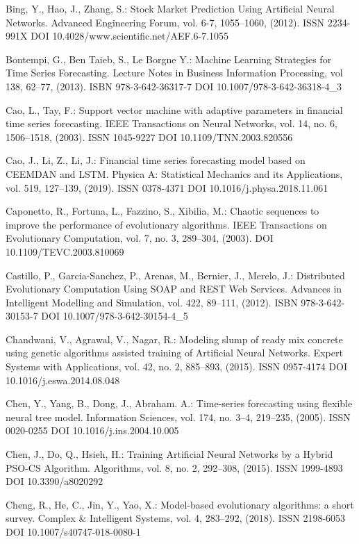 \begin{thebibliography}{99.}
 Bing, Y., Hao, J., Zhang, S.: Stock Market Prediction Using Artificial Neural Networks. Advanced Engineering Forum, vol. 6-7, 1055--1060, (2012). ISSN 2234-991X DOI 10.4028/www.scientific.net/AEF.6-7.1055

 Bontempi, G., Ben Taieb, S., Le Borgne Y.: Machine Learning Strategies for Time Series Forecasting. Lecture Notes in Business Information Processing, vol 138, 62--77, (2013). ISBN 978-3-642-36317-7 DOI 10.1007/978-3-642-36318-4\_3

 Cao, L., Tay, F.: Support vector machine with adaptive parameters in financial time series forecasting. IEEE Transactions on Neural Networks, vol. 14, no. 6, 1506--1518, (2003). ISSN 1045-9227 DOI 10.1109/TNN.2003.820556

 Cao, J., Li, Z., Li, J.: Financial time series forecasting model based on CEEMDAN and LSTM. Physica A: Statistical Mechanics and its Applications, vol. 519, 127--139, (2019). ISSN 0378-4371 DOI 10.1016/j.physa.2018.11.061

 Caponetto, R., Fortuna, L., Fazzino, S., Xibilia, M.: Chaotic sequences to improve the performance of evolutionary algorithms. IEEE Transactions on Evolutionary Computation, vol. 7, no. 3, 289--304, (2003). DOI 10.1109/TEVC.2003.810069

 Castillo, P., Garcia-Sanchez, P., Arenas, M., Bernier, J., Merelo, J.: Distributed Evolutionary Computation Using SOAP and REST Web Services. Advances in Intelligent Modelling and Simulation, vol. 422, 89--111, (2012). ISBN 978-3-642-30153-7 DOI 10.1007/978-3-642-30154-4\_5

 Chandwani, V., Agrawal, V., Nagar, R.: Modeling slump of ready mix concrete using genetic algorithms assisted training of Artificial Neural Networks. Expert Systems with Applications, vol. 42, no. 2, 885--893, (2015). ISSN 0957-4174 DOI 10.1016/j.eswa.2014.08.048

 Chen, Y., Yang, B., Dong, J., Abraham. A.: Time-series forecasting using flexible neural tree model. Information Sciences, vol. 174, no. 3--4, 219--235, (2005). ISSN 0020-0255 DOI 10.1016/j.ins.2004.10.005

 Chen, J., Do, Q., Hsieh, H.: Training Artificial Neural Networks by a Hybrid PSO-CS Algorithm. Algorithms, vol. 8, no. 2, 292--308, (2015). ISSN 1999-4893 DOI 10.3390/a8020292

 Cheng, R., He, C., Jin, Y., Yao, X.: Model-based evolutionary algorithms: a short survey. Complex \& Intelligent Systems, vol. 4, 283--292, (2018). ISSN 2198-6053 DOI 10.1007/s40747-018-0080-1


\end{thebibliography}
